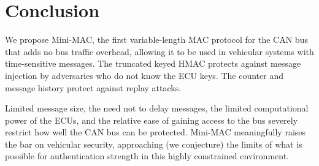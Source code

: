\section{Conclusion}
\label{conclude}

We propose Mini-MAC, the first variable-length MAC protocol for the CAN bus that adds no bus traffic overhead, 
allowing it to be used in vehicular systems with time-sensitive messages.  The truncated keyed HMAC protects against
message injection by adversaries who do not know the ECU keys.  The counter and message history protect
against replay attacks.  

Limited message size, the need not to delay messages, the limited computational power of the ECUs,
and the relative ease of gaining access to the bus 
severely restrict how well the CAN bus can be protected.  Mini-MAC meaningfully raises the bar on vehicular security,
approaching (we conjecture) the limits of what is possible for authentication strength in this highly
constrained environment.

